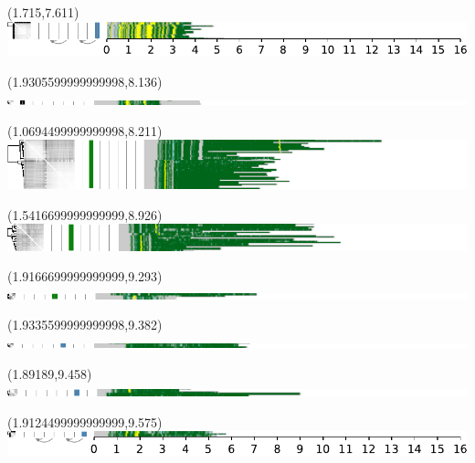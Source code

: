 \documentclass{article}
\begin{document}
\begin{textblock}{13}(1.715,7.611)\includegraphics{./Figure_S5/chr12-HG007.pdf}\end{textblock}
\begin{textblock}{13}(1.9305599999999998,8.136)\includegraphics{./Figure_S5/14qtel_1-500K_1_12_12_rc-HG001.pdf}\end{textblock}
\begin{textblock}{13}(1.0694499999999998,8.211)\includegraphics{./Figure_S5/14qtel_1-500K_1_12_12_rc-HG002.pdf}\end{textblock}
\begin{textblock}{13}(1.5416699999999999,8.926)\includegraphics{./Figure_S5/14qtel_1-500K_1_12_12_rc-HG003.pdf}\end{textblock}
\begin{textblock}{13}(1.9166699999999999,9.293)\includegraphics{./Figure_S5/14qtel_1-500K_1_12_12_rc-HG004.pdf}\end{textblock}
\begin{textblock}{13}(1.9335599999999998,9.382)\includegraphics{./Figure_S5/14qtel_1-500K_1_12_12_rc-HG005.pdf}\end{textblock}
\begin{textblock}{13}(1.89189,9.458)\includegraphics{./Figure_S5/14qtel_1-500K_1_12_12_rc-HG006.pdf}\end{textblock}
\begin{textblock}{13}(1.9124499999999999,9.575)\includegraphics{./Figure_S5/14qtel_1-500K_1_12_12_rc-HG007.pdf}\end{textblock}
\end{document}
